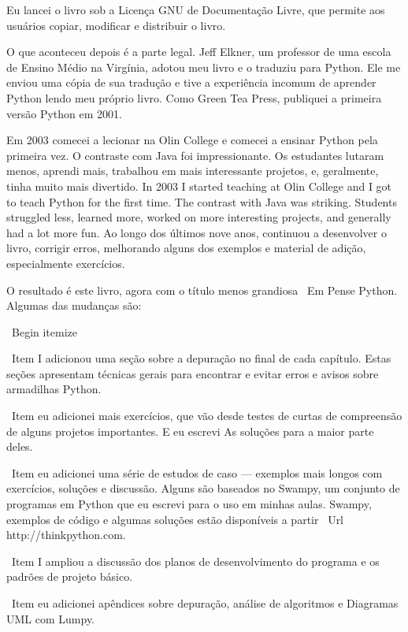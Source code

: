 \documentclass[10pt]{book}
\begin{document}
Eu lancei o livro sob a Licença GNU de Documentação Livre,
que permite aos usuários copiar, modificar e distribuir o livro.

O que aconteceu depois é a parte legal. Jeff Elkner, um professor de uma escola
de Ensino Médio na Virgínia, adotou meu livro e o traduziu para
Python. Ele me enviou uma cópia de sua tradução e tive a
experiência incomum de aprender Python lendo meu próprio livro.
Como Green Tea Press, publiquei a primeira versão Python em 2001.

Em 2003 comecei a lecionar na Olin College e comecei a ensinar
Python pela primeira vez. O contraste com Java foi impressionante.
Os estudantes lutaram menos, aprendi mais, trabalhou em mais interessante
projetos, e, geralmente, tinha muito mais divertido.
In 2003 I started teaching at Olin College and I got to teach
Python for the first time.  The contrast with Java was striking.
Students struggled less, learned more, worked on more interesting
projects, and generally had a lot more fun.
Ao longo dos últimos nove anos, continuou a desenvolver o livro,
corrigir erros, melhorando alguns dos exemplos e
material de adição, especialmente exercícios.

O resultado é este livro, agora com o título menos grandiosa
{\ Em Pense Python}. Algumas das mudanças são:

\ Begin {itemize}

\ Item I adicionou uma seção sobre a depuração no final de cada capítulo.
  Estas seções apresentam técnicas gerais para encontrar e evitar
  erros e avisos sobre armadilhas Python.

\ Item eu adicionei mais exercícios, que vão desde testes de curtas de
  compreensão de alguns projetos importantes. E eu escrevi
  As soluções para a maior parte deles.

\ Item eu adicionei uma série de estudos de caso --- exemplos mais longos com
  exercícios, soluções e discussão. Alguns são baseados no
  Swampy, um conjunto de programas em Python que eu escrevi para o uso em minhas aulas.
  Swampy, exemplos de código e algumas soluções estão disponíveis a partir
  \ Url {http://thinkpython.com}.
  
\ Item I ampliou a discussão dos planos de desenvolvimento do programa
  e os padrões de projeto básico.

\ Item eu adicionei apêndices sobre depuração, análise de algoritmos e
  Diagramas UML com Lumpy.
\end{document}
